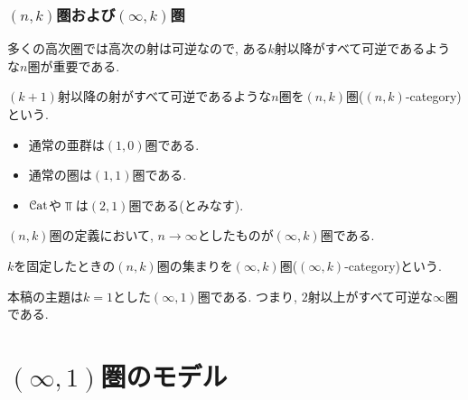 \documentclass[aspectratio=169, dvipdfmx, 8pt, notheorems, uplatex]{beamer}
\begin{document}
\begin{frame}
  \frametitle{$(n,k)$圏および$(\infty,k)$圏}

  多くの高次圏では高次の射は可逆なので, ある$k$射以降がすべて可逆であるような$n$圏が重要である. 
  
  \begin{definition}[$(n,k)$圏]
    $(k+1)$射以降の射がすべて可逆であるような$n$圏を$(n,k)$圏($(n,k)$-category)という.
  \end{definition}

  \begin{example}
    \begin{itemize}
      \item 通常の亜群は$(1,0)$圏である. 
      \item 通常の圏は$(1,1)$圏である. 
      \item $\mathcal{C}\mathrm{at}$や$\Top$は$(2,1)$圏である(とみなす). 
    \end{itemize}
  \end{example}

  $(n,k)$圏の定義において, $n \to \infty$としたものが$(\infty,k)$圏である. 

  \begin{definition}[$(\infty,k)$圏]
    $k$を固定したときの$(n,k)$圏の集まりを$(\infty,k)$圏($(\infty,k)$-category)という. 
  \end{definition}
  
  本稿の主題は$k=1$とした$(\infty,1)$圏である. 
  つまり, $2$射以上がすべて可逆な$\infty$圏である.
\end{frame}

\section{$(\infty,1)$圏のモデル}
\end{document}
